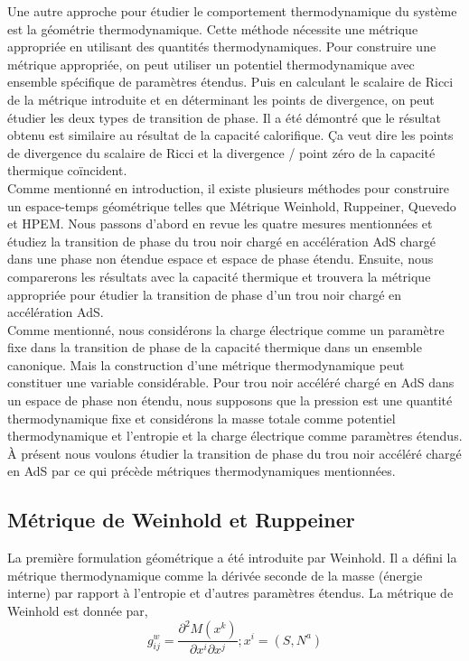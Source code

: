 Une autre approche pour étudier le comportement thermodynamique du système est la géométrie thermodynamique. Cette méthode nécessite une métrique appropriée en utilisant des quantités thermodynamiques. Pour construire une métrique appropriée, on peut utiliser un potentiel thermodynamique avec
ensemble spécifique de paramètres étendus. Puis en calculant le scalaire de Ricci de la métrique introduite
et en déterminant les points de divergence, on peut étudier les deux types de transition de phase. Il
a été démontré que le résultat obtenu est similaire au résultat de la capacité calorifique. Ça veut dire
les points de divergence du scalaire de Ricci et la divergence / point zéro de la capacité thermique coïncident.\\
Comme mentionné en introduction, il existe plusieurs méthodes pour construire un espace-temps géométrique telles que
Métrique Weinhold, Ruppeiner, Quevedo et HPEM. Nous passons d'abord en revue les quatre mesures mentionnées
et étudiez la transition de phase du trou noir chargé en accélération AdS chargé dans une phase non étendue
espace et espace de phase étendu. Ensuite, nous comparerons les résultats avec la capacité thermique et
trouvera la métrique appropriée pour étudier la transition de phase d'un trou noir chargé en accélération AdS.\\
Comme mentionné, nous considérons la charge électrique comme un paramètre fixe dans la transition de phase
de la capacité thermique dans un ensemble canonique. Mais la construction d'une métrique thermodynamique peut constituer une variable considérable. Pour trou noir accéléré chargé en AdS dans un espace de phase non étendu,
nous supposons que la pression est une quantité thermodynamique fixe et considérons la masse totale comme
potentiel thermodynamique et l'entropie et la charge électrique comme paramètres étendus. À présent
nous voulons étudier la transition de phase du trou noir accéléré chargé en AdS par ce qui précède
métriques thermodynamiques mentionnées.

\subsection{Métrique de Weinhold et Ruppeiner}
La première formulation géométrique a été introduite par Weinhold\cite{52}. Il a défini la métrique thermodynamique
 comme la dérivée seconde de la masse (énergie interne) par rapport à l'entropie et
d'autres paramètres étendus. La métrique de Weinhold est donnée par,
\begin{equation}
g_{ij}^{w}=\dfrac{\partial^{2}M(x^{k})}{\partial x^{i} \partial x^{j} };  x^{i}=(S,N^{a}) 
\end{equation}

